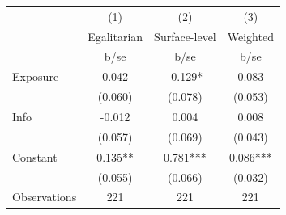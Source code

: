 {
\def\sym#1{\ifmmode^{#1}\else\(^{#1}\)\fi}
\begin{tabular}{l*{3}{c}}
\hline\hline
                    &\multicolumn{1}{c}{(1)}&\multicolumn{1}{c}{(2)}&\multicolumn{1}{c}{(3)}\\
                    &\multicolumn{1}{c}{Egalitarian}&\multicolumn{1}{c}{Surface-level}&\multicolumn{1}{c}{Weighted}\\
                    &        b/se   &        b/se   &        b/se   \\
\hline
Exposure            &       0.042   &      -0.129*  &       0.083   \\
                    &     (0.060)   &     (0.078)   &     (0.053)   \\
Info                &      -0.012   &       0.004   &       0.008   \\
                    &     (0.057)   &     (0.069)   &     (0.043)   \\
Constant            &       0.135** &       0.781***&       0.086***\\
                    &     (0.055)   &     (0.066)   &     (0.032)   \\
\hline
Observations        &         221   &         221   &         221   \\
\hline\hline
\end{tabular}
}
